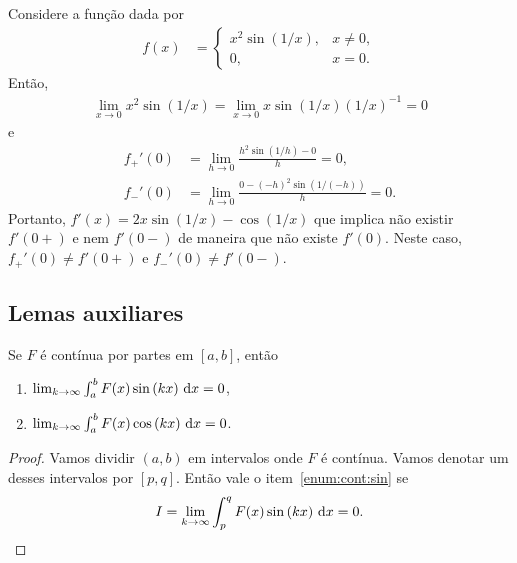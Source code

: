 \begin{exem}
    Considere a fun\c{c}\~{a}o dada por
    \begin{align*}
        f(x) &= \begin{cases}
            x^2 \sin\left( 1 / x \right), & x \neq 0, \\
            0, & x = 0.
        \end{cases}
    \end{align*}
    Ent\~{a}o,
    \begin{align*}
        \lim_{x \to 0} x^2 \sin\left( 1 / x \right) = \lim_{x \to 0} x \sin\left( 1 / x \right) \left( 1 / x \right)^{-1} = 0
    \end{align*}
    e
    \begin{align*}
        f_+'(0) &= \lim_{h \to 0} \frac{h^2 \sin\left( 1 / h \right) - 0}{h} = 0, \\
        f_-'(0) &= \lim_{h \to 0} \frac{0 - (-h)^2 \sin\left( 1 / (-h) \right)}{h} = 0.
    \end{align*}
    Portanto, $f'(x) = 2 x \sin\left( 1 / x \right) - \cos\left( 1 / x \right)$ que implica n\~{a}o existir $f'(0+)$ e nem $f'(0-)$ de maneira que n\~{a}o existe $f'(0)$. Neste caso, $f_+'(0) \neq f'(0+)$ e $f_-'(0) \neq f'(0-)$.
\end{exem}

\subsection{Lemas auxiliares}
\begin{lem} \label{lem:cont}
    Se $F$ \'{e} cont\'{i}nua por partes em $[a,b]$, ent\~{a}o
    \begin{enumerate}
        \item \label{enum:cont:sin} $\lim_{k \to \infty} \int_a^b F(x) \sin\left( k x \right) \, \mathrm{d}x = 0$, 
        \item \label{enum:cont:cos} $\lim_{k \to \infty} \int_a^b F(x) \cos\left( k x \right) \, \mathrm{d}x = 0$.
    \end{enumerate}
\end{lem}
\begin{proof}
    Vamos dividir $(a,b)$ em intervalos onde $F$ \'{e} cont\'{i}nua. Vamos denotar um desses intervalos por $[p,q]$. Ent\~{a}o vale o item~\ref{enum:cont:sin} se
    \begin{align*}
        I = \lim_{k \to \infty} \int_p^q F(x) \sin\left( k x \right) \, \mathrm{d}x = 0.
    \end{align*}
\end{proof}

